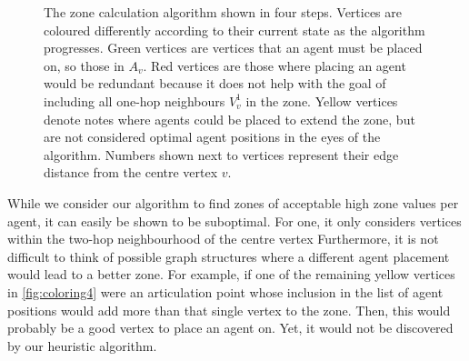\begin{figure}
  \caption{The zone calculation algorithm shown in four steps.
           Vertices are coloured differently according to their current state as the algorithm progresses.
           Green vertices are vertices that an agent must be placed on, so those in $A_v$.
           Red vertices are those where placing an agent would be redundant because it does not help with the goal of including all one-hop neighbours $V_v^1$ in the zone.
           Yellow vertices denote notes where agents could be placed to extend the zone, but are not considered optimal agent positions in the eyes of the algorithm.
           Numbers shown next to vertices represent their edge distance from the centre vertex $v$.}
  \label{fig:coloring}
\end{figure}
While we consider our algorithm to find zones of acceptable high zone values per agent, it can easily be shown to be suboptimal.
For one, it only considers vertices within the two-hop neighbourhood of the centre vertex
Furthermore, it is not difficult to think of possible graph structures where a different agent placement would lead to a better zone.
For example, if one of the remaining yellow vertices in \autoref{fig:coloring4} were an articulation point whose inclusion in the list of agent positions would add more than that single vertex to the zone.
Then, this would probably be a good vertex to place an agent on.
Yet, it would not be discovered by our heuristic algorithm.

